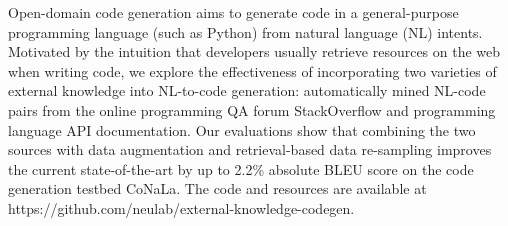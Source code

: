Open-domain code generation aims to generate code in a general-purpose programming language (such as Python) from natural language (NL) intents. Motivated by the intuition that developers usually retrieve resources on the web when writing code, we explore the effectiveness of incorporating two varieties of external knowledge into NL-to-code generation: automatically mined NL-code pairs from the online programming QA forum StackOverflow and programming language API documentation. Our evaluations show that combining the two sources with data augmentation and retrieval-based data re-sampling improves the current state-of-the-art by up to 2.2\% absolute BLEU score on the code generation testbed CoNaLa. The code and resources are available at https://github.com/neulab/external-knowledge-codegen.
